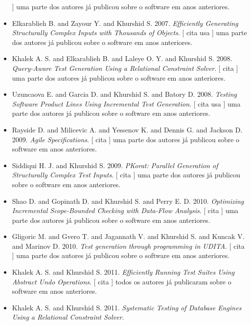 \begin{itemize}
      ]
uma parte dos autores já publicou sobre o software em anos anteriores.
\item Elkarablieh B. and Zayour Y. and Khurshid S.
      2007.
        \textit{ Efficiently Generating Structurally Complex Inputs with Thousands of Objects}.
      [
          cita
          usa
      ]
uma parte dos autores já publicou sobre o software em anos anteriores.
\item Khalek A. S. and Elkarablieh B. and Laleye O. Y. and Khurshid S.
      2008.
        \textit{ Query-Aware Test Generation Using a Relational Constraint Solver}.
      [
          cita
      ]
uma parte dos autores já publicou sobre o software em anos anteriores.
\item Uzuncaova E. and Garcia D. and Khurshid S. and Batory D.
      2008.
        \textit{ Testing Software Product Lines Using Incremental Test Generation}.
      [
          cita
          usa
      ]
uma parte dos autores já publicou sobre o software em anos anteriores.
\item Rayside D. and Milicevic A. and Yessenov K. and Dennis G. and Jackson D.
      2009.
        \textit{ Agile Specifications}.
      [
          cita
      ]
uma parte dos autores já publicou sobre o software em anos anteriores.
\item Siddiqui H. J. and Khurshid S.
      2009.
        \textit{ PKorat: Parallel Generation of Structurally Complex Test Inputs}.
      [
          cita
      ]
uma parte dos autores já publicou sobre o software em anos anteriores.
\item Shao D. and Gopinath D. and Khurshid S. and Perry E. D.
      2010.
        \textit{ Optimizing Incremental Scope-Bounded Checking with Data-Flow Analysis}.
      [
          cita
      ]
uma parte dos autores já publicou sobre o software em anos anteriores.
\item Gligoric M. and Gvero T. and Jagannath V. and Khurshid S. and Kuncak V. and Marinov D.
      2010.
        \textit{ Test generation through programming in UDITA}.
      [
          cita
      ]
uma parte dos autores já publicou sobre o software em anos anteriores.
\item Khalek A. S. and Khurshid S.
      2011.
        \textit{ Efficiently Running Test Suites Using Abstract Undo Operations}.
      [
          cita
      ]
todos os autores já publicaram sobre o software em anos anteriores.
\item Khalek A. S. and Khurshid S.
      2011.
        \textit{ Systematic Testing of Database Engines Using a Relational Constraint Solver}.

\end{itemize}
